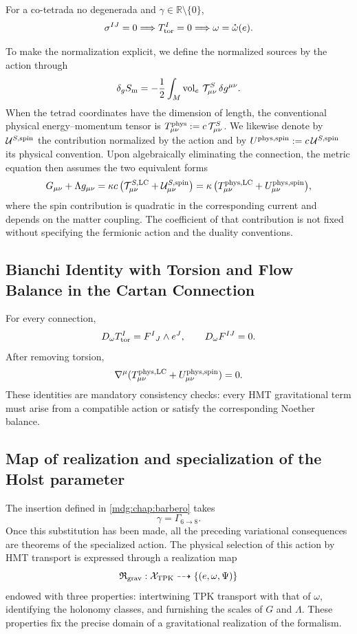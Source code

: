 \begin{corollary}
For a co-tetrada no degenerada and
\(\gamma\in\mathbb R\setminus\{0\}\),
\[
 \sigma^{IJ}=0\Longrightarrow T_{\rm tor}^I=0
 \Longrightarrow\omega=\mathring\omega(e).
\]
\end{corollary}

To make the normalization explicit, we define the normalized sources by
the action through
\[
 \delta_g S_{\rm m}
 =-\frac12\int_M\operatorname{vol}_e\,
 \mathcal T^{S}_{\mu\nu}\,\delta g^{\mu\nu}.
\]
When the tetrad coordinates have the dimension of length, the conventional
physical energy--momentum tensor is
\(T^{\rm phys}_{\mu\nu}:=c\,\mathcal T^{S}_{\mu\nu}\). We likewise denote by
\(\mathcal U^{S,\rm spin}\) the contribution normalized by the
action and by \(U^{\rm phys,\rm spin}:=c\,\mathcal U^{S,\rm spin}\) its physical
convention. Upon algebraically eliminating the connection, the metric
equation then assumes the two equivalent forms
\[
 G_{\mu\nu}+\Lambda g_{\mu\nu}
 =\kappa c\,
 \bigl(\mathcal T_{\mu\nu}^{S,\rm LC}
       +\mathcal U_{\mu\nu}^{S,\rm spin}\bigr)
 =\kappa\,
 \bigl(T_{\mu\nu}^{\rm phys,LC}
       +U_{\mu\nu}^{\rm phys,spin}\bigr),
\]
where the spin contribution is quadratic in the corresponding current
and depends on the matter coupling. The coefficient of that contribution is not
fixed without specifying the fermionic action and the duality
conventions.

\subsection{Bianchi Identity with Torsion and Flow Balance in the Cartan Connection}

For every connection,
\[
 D_\omega T_{\rm tor}^I=F^I{}_J\wedge e^J,
 \qquad
 D_\omega F^{IJ}=0.
\]
After removing torsion,
\[
\nabla^\mu(T_{\mu\nu}^{\rm phys,LC}
          +U_{\mu\nu}^{\rm phys,spin})=0.
\]
These identities are mandatory consistency checks: every HMT
gravitational term must arise from a compatible action or satisfy the corresponding
Noether balance.

\subsection{Map of realization and specialization of the Holst parameter}

The insertion defined in \cref{mdg:chap:barbero} takes
\[
 \gamma=\Gamma_{6\to8}.
\]
Once this substitution has been made, all the preceding variational consequences
are theorems of the specialized action. The physical selection of
this action by HMT transport is expressed through a realization map
\[
 \mathfrak R_{\rm grav}:\mathcal X_{\rm TPK}
 \dashrightarrow\{(e,\omega,\Psi)\}
\]
endowed with three properties: intertwining TPK transport with that of
\(\omega\), identifying the holonomy classes, and furnishing the scales of
\(G\) and \(\Lambda\). These properties fix the precise domain of a
gravitational realization of the formalism.

